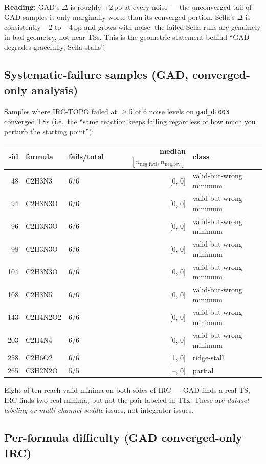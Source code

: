 \documentclass[11pt]{article}
\begin{document}
\textbf{Reading:} GAD's $\Delta$ is roughly $\pm 2$\,pp at every noise
--- the unconverged tail of GAD samples is only marginally worse than
its converged portion. Sella's $\Delta$ is consistently $-2$ to $-4$\,pp
and grows with noise: the failed Sella runs are genuinely in bad
geometry, not near TSs. This is the geometric statement behind ``GAD
degrades gracefully, Sella stalls''.

\subsection{Systematic-failure samples (GAD, converged-only analysis)}

Samples where IRC-TOPO failed at $\geq$5 of 6 noise levels on
\texttt{gad\_dt003} converged TSs (i.e.\ the ``same reaction keeps
failing regardless of how much you perturb the starting point''):

\begin{center}
\begin{tabular}{rll r l}
\toprule
sid & formula & fails/total & median $[n_{\text{neg,fwd}}, n_{\text{neg,rev}}]$ & class \\
\midrule
48  & C2H3N3   & 6/6 & [0, 0] & valid-but-wrong minimum \\
94  & C2H3N3O  & 6/6 & [0, 0] & valid-but-wrong minimum \\
96  & C2H3N3O  & 6/6 & [0, 0] & valid-but-wrong minimum \\
98  & C2H3N3O  & 6/6 & [0, 0] & valid-but-wrong minimum \\
104 & C2H3N3O  & 6/6 & [0, 0] & valid-but-wrong minimum \\
108 & C2H3N5   & 6/6 & [0, 0] & valid-but-wrong minimum \\
143 & C2H4N2O2 & 6/6 & [0, 0] & valid-but-wrong minimum \\
203 & C2H4N4   & 6/6 & [0, 0] & valid-but-wrong minimum \\
258 & C2H6O2   & 6/6 & [1, 0] & ridge-stall \\
265 & C3H2N2O  & 5/5 & [--, 0] & partial \\
\bottomrule
\end{tabular}
\end{center}

Eight of ten reach valid minima on both sides of IRC --- GAD finds a
real TS, IRC finds two real minima, but not the pair labeled in T1x.
These are \emph{dataset labeling or multi-channel saddle} issues,
not integrator issues.

\subsection{Per-formula difficulty (GAD converged-only IRC)}
\end{document}
